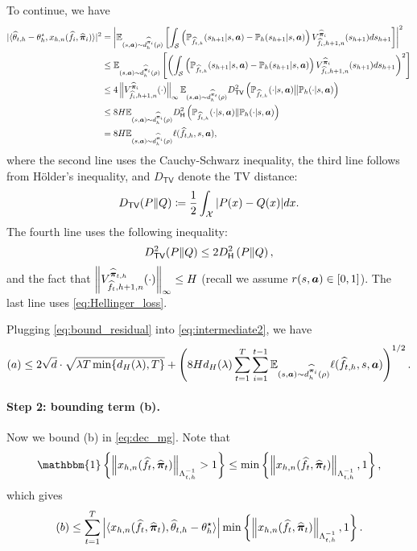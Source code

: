 To continue, we have
\begin{align}\label{eq:bound_residual}
    |\langle \widehat{\theta}_{t,h}-\theta_h^\star,x_{h,n}(\widehat{f}_i,\widehat{{\bm{\pi}}}_i)\rangle|^2 &= \left|\mathbb{E}_{(s,{\bm{a}})\sim d_h^{\widehat{{\bm{\pi}}}_i}(\rho)}\left[\int_{\mathcal{S}} \left({\mathbb P}_{\widehat{f}_{t,h}}(s_{h+1}|s,{\bm{a}})-{\mathbb P}_h(s_{h+1}|s,{\bm{a}}) \right)V_{\widehat{f}_i,h+1,n}^{\widehat{{\bm{\pi}}}_i}(s_{h+1})ds_{h+1}\right]\right|^2\notag\\
    &\leq \mathbb{E}_{(s,{\bm{a}})\sim d_h^{\widehat{{\bm{\pi}}}_i}(\rho)} \left[\left(\int_{\mathcal{S}} \left({\mathbb P}_{\widehat{f}_{t,h}}(s_{h+1}|s,{\bm{a}})-{\mathbb P}_h(s_{h+1}|s,{\bm{a}}) \right)V_{\widehat{f}_i,h+1,n}^{\widehat{{\bm{\pi}}}_i}(s_{h+1})ds_{h+1}\right)^2\right]\notag\\
    &\leq 4\left\| V_{\widehat{f}_i,h+1,n}^{\widehat{{\bm{\pi}}}_i}(\cdot) \right\|_\infty\mathbb{E}_{(s,{\bm{a}})\sim d_h^{\widehat{{\bm{\pi}}}_{t}}(\rho)}D_{\mathsf{TV}}^2\left({\mathbb P}_{\widehat{f}_{t,h}}(\cdot|s,{\bm{a}})\big\|{\mathbb P}_h(\cdot|s,{\bm{a}})\right)\notag\\
    &\leq 8H\mathbb{E}_{(s,{\bm{a}})\sim d_h^{\widehat{{\bm{\pi}}}_i}(\rho)}D_{\mathsf{H}}^2\left({\mathbb P}_{\widehat{f}_{t,h}}(\cdot|s,{\bm{a}})\|{\mathbb P}_h(\cdot|s,{\bm{a}})\right)\notag\\
    &=8H \mathbb{E}_{(s,{\bm{a}})\sim d_h^{\widehat{{\bm{\pi}}}_i}(\rho)}\ell(\widehat{f}_{t,h},s,{\bm{a}}),
\end{align}
where the second line uses the Cauchy-Schwarz inequality, the third line follows from H\"older's inequality, and $D_\mathsf{TV}$ denote the TV distance:
\begin{align}\label{eq:TV}
    D_{\mathsf{TV}}(P\|Q)\coloneqq \frac{1}{2}\int_{\mathcal{X}} |P(x)-Q(x)|dx.
\end{align}
The fourth line uses the following inequality:
$$D_{\mathsf{TV}}^2(P\|Q)\leq2D_{\mathsf{H}}^2\left(P\|Q\right),$$
and the fact that $\left\| V_{\widehat{f}_{t},h+1,n}^{\widehat{{\bm{\pi}}}_{t,h}}(\cdot) \right\|_\infty\leq H$ (recall we assume $r(s,{\bm{a}})\in[0,1]$). The last line uses \eqref{eq:Hellinger_loss}.

Plugging \eqref{eq:bound_residual} into \eqref{eq:intermediate2}, we have
\begin{align}\label{eqLbound_a_mg}
    (a)\leq 2\sqrt{d}\cdot\sqrt{\lambda T \min\{d_H(\lambda),T\}} + \left(8Hd_H(\lambda)\sum_{t=1}^T \sum_{i=1}^{t-1} \mathbb{E}_{(s,{\bm{a}})\sim d_h^{\widehat{{\bm{\pi}}}_i}(\rho)}\ell(\widehat{f}_{t,h},s,{\bm{a}})\right)^{1/2}.
\end{align}

\paragraph{Step 2: bounding term (b).} Now we bound (b) in \eqref{eq:dec_mg}. Note that
$$
\mathbbm{1}\left\{\norm{x_{h,n}(\widehat{f}_{t},\widehat{\vpi}_{t})}_{\Lambda_{t,h}^{-1}}> 1\right\}\leq \min\left\{ \norm{x_{h,n}(\widehat{f}_{t},\widehat{\vpi}_{t})}_{\Lambda_{t,h}^{-1}},1\right\},
$$
which gives
\begin{align}\label{eq:bound_b_pre}
    (b)\leq \sum_{t=1}^T \left| \langle x_{h,n}(\widehat{f}_{t},\widehat{{\bm{\pi}}}_{t}),\widehat{\theta}_{t,h}-\theta_h^\star\rangle\right|\min\left\{ \left\| x_{h,n}(\widehat{f}_{t},\widehat{{\bm{\pi}}}_{t}) \right\|_{\Lambda_{t,h}^{-1}},1\right\}.
\end{align}

